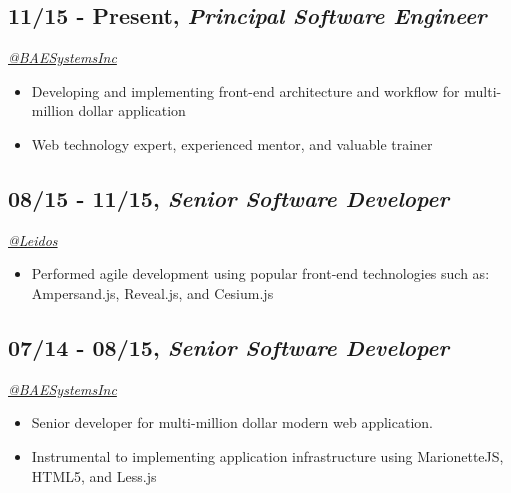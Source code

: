 \documentclass[10pt]{article}
\def\tightlist{}
\begin{document}
\hypertarget{present-principal-software-engineer}{%
\subsection{\texorpdfstring{11/15 - Present, \textbf{\emph{Principal
Software
Engineer}}}{11/15 - Present, Principal Software Engineer}}\label{present-principal-software-engineer}}

\emph{\href{https://twitter.com/BAESystemsInc}{@BAESystemsInc}}

\begin{itemize}
\tightlist
\item
  Developing and implementing front-end architecture and workflow for
  multi-million dollar application
\item
  Web technology expert, experienced mentor, and valuable trainer
\end{itemize}

\hypertarget{senior-software-developer}{%
\subsection{\texorpdfstring{08/15 - 11/15, \textbf{\emph{Senior Software
Developer}}}{08/15 - 11/15, Senior Software Developer}}\label{senior-software-developer}}

\emph{\href{https://twitter.com/LeidosInc}{@Leidos}}

\begin{itemize}
\tightlist
\item
  Performed agile development using popular front-end technologies such
  as: Ampersand.js, Reveal.js, and Cesium.js
\end{itemize}

\hypertarget{senior-software-developer-1}{%
\subsection{\texorpdfstring{07/14 - 08/15, \textbf{\emph{Senior Software
Developer}}}{07/14 - 08/15, Senior Software Developer}}\label{senior-software-developer-1}}

\emph{\href{https://twitter.com/BAESystemsInc}{@BAESystemsInc}}

\begin{itemize}
\tightlist
\item
  Senior developer for multi-million dollar modern web application.
\item
  Instrumental to implementing application infrastructure using
  MarionetteJS, HTML5, and Less.js
\end{itemize}
\end{document}
